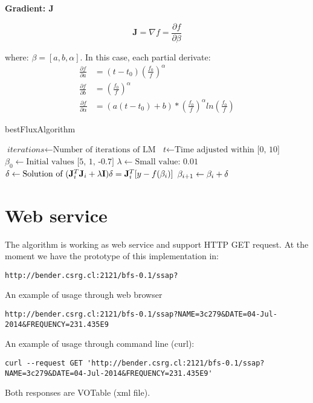 \documentclass[10pt]{article}
\begin{document}
\noindent\textbf{Gradient: $\mathbf{J}$} 

$$ \mathbf{J} = \nabla f = \frac{\partial f}{\partial \beta} $$ 

where: $\beta = [a, b, \alpha]$. In this case, each partial derivate:
\begin{align*}
    \frac{\partial f}{\partial a}           &= (t - t_0)\left(\frac{f_0}{f}\right)^\alpha \\
    \frac{\partial f}{\partial b}           &= \left(\frac{f_0}{f}\right)^\alpha \\
    \frac{\partial f}{\partial \alpha}      &= (a(t-t_0)+b)*\left(\frac{f_0}{f}\right)^\alpha ln\left(\frac{f_0}{f}\right)
\end{align*}


\begin{algorithm}
\caption{bestFluxAlgorithm}\label{4months}
\begin{algorithmic}[1]
\State $\textit{iterations} \gets \text{Number of iterations of LM}$
\Statex
\State $\textit{t} \gets \text{Time adjusted within [0, 10]}$
\Statex
\State $\textit{$\beta_0$} \gets \text{Initial values [5, 1, -0.7]}$
\Statex
\State $\textit{$\lambda$} \gets \text{Small value: 0.01}$
\Statex
{}
\Statex
\State $\textit{$\delta$} \gets \text{Solution of $ (\mathbf{J}_i^{T}\mathbf{J}_i + \lambda\mathbf{I})\delta = \mathbf{J}_i^{T}[y - f(\beta_i)] $}$
\Statex
\State $\textit{$\beta_{i+1}$} \gets \text{$ \beta_i + \delta $}$
\Statex
\EndFor
\State {}
\EndProcedure
\end{algorithmic}
\end{algorithm}

\section{Web service}
The algorithm is working as web service and support HTTP GET request. At the moment we have the
prototype of this implementation in:

\begingroup
\fontsize{8pt}{10pt}\selectfont
\begin{verbatim}
http://bender.csrg.cl:2121/bfs-0.1/ssap?
\end{verbatim}
\endgroup

\noindent An example of usage through web browser
\begingroup
\fontsize{8pt}{10pt}\selectfont
\begin{verbatim}
http://bender.csrg.cl:2121/bfs-0.1/ssap?NAME=3c279&DATE=04-Jul-2014&FREQUENCY=231.435E9
\end{verbatim}
\endgroup

\noindent An example of usage through command line (curl):
\begingroup
\fontsize{8pt}{10pt}\selectfont
\begin{verbatim}
curl --request GET 'http://bender.csrg.cl:2121/bfs-0.1/ssap?NAME=3c279&DATE=04-Jul-2014&FREQUENCY=231.435E9'
\end{verbatim}
\endgroup

Both responses are VOTable (xml file).
\end{document}
